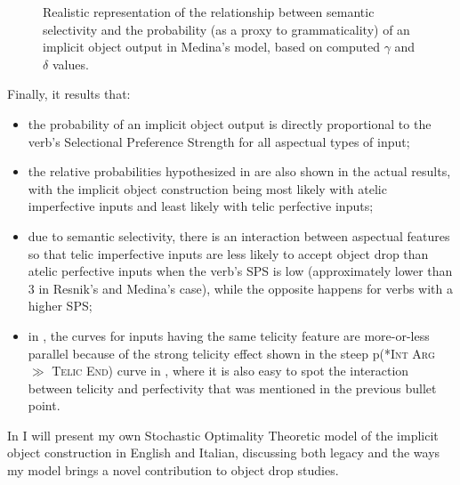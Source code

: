 \begin{figure}[htb]
\caption{Realistic representation of the relationship between semantic selectivity and the probability (as a proxy to grammaticality) of an implicit object output in Medina's model, based on computed $\gamma$ and $\delta$ values.}
\end{figure}

Finally, it results that:
\begin{itemize}
    \item the probability of an implicit object output is directly proportional to the verb's Selectional Preference Strength for all aspectual types of input;
    \item the relative probabilities hypothesized in  are also shown in the actual results, with the implicit object construction being most likely with atelic imperfective inputs and least likely with telic perfective inputs;
    \item due to semantic selectivity, there is an interaction between aspectual features so that telic imperfective inputs are less likely to accept object drop than atelic perfective inputs when the verb's SPS is low (approximately lower than 3 in Resnik's and Medina's case), while the opposite happens for verbs with a higher SPS;
    \item in , the curves for inputs having the same telicity feature are more-or-less parallel because of the strong telicity effect shown in the steep p(\textsc{*Int Arg} $\gg$ \textsc{Telic End}) curve in , where it is also easy to spot the interaction between telicity and perfectivity that was mentioned in the previous bullet point.
\end{itemize}

In  I will present my own Stochastic Optimality Theoretic model of the implicit object construction in English and Italian, discussing both  legacy and the ways my model brings a novel contribution to object drop studies.